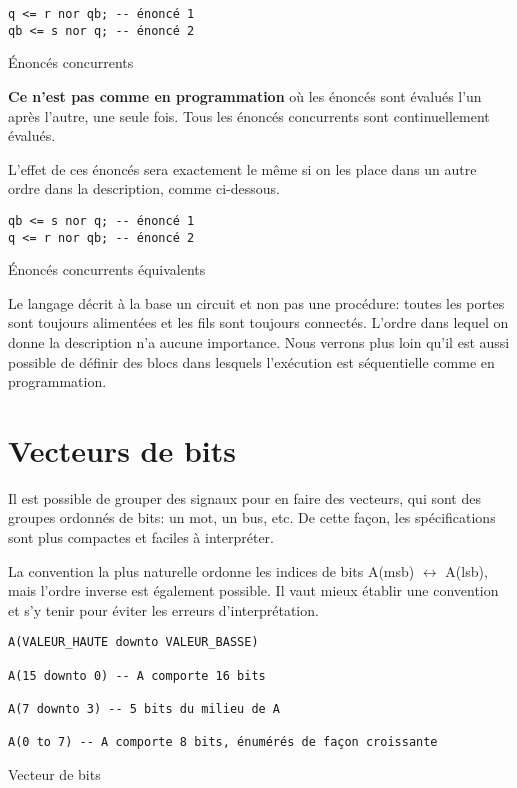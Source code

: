 \documentclass[letter, oneside]{book}
\begin{document}
\begin{listing}[htbp]
\begin{verbatim}
q <= r nor qb; -- énoncé 1
qb <= s nor q; -- énoncé 2
\end{verbatim}
\caption{Énoncés concurrents}
\end{listing}

\textbf{Ce n'est pas comme en programmation} où les énoncés sont évalués
l'un après l'autre, une seule fois. Tous les énoncés concurrents sont
continuellement évalués.

L'effet de ces énoncés sera exactement le même si on les place dans un
autre ordre dans la description, comme ci-dessous.

\begin{listing}[htbp]
\begin{verbatim}
qb <= s nor q; -- énoncé 1
q <= r nor qb; -- énoncé 2
\end{verbatim}
\caption{Énoncés concurrents équivalents}
\end{listing}

Le langage décrit à la base un circuit et non pas une procédure:
toutes les portes sont toujours alimentées et les fils sont toujours
connectés. L'ordre dans lequel on donne la description n'a aucune
importance. Nous verrons plus loin qu'il est aussi possible de définir
des blocs dans lesquels l'exécution est séquentielle comme en
programmation.

\section{Vecteurs de bits}
\label{sec:org5384bab}

Il est possible de grouper des signaux pour en faire des vecteurs, qui
sont des groupes ordonnés de bits: un mot, un bus, etc. De cette
façon, les spécifications sont plus compactes et faciles à
interpréter.

La convention la plus naturelle ordonne les indices de bits 
A(msb) \(\longleftrightarrow\) A(lsb),
mais l'ordre inverse est également possible. Il vaut mieux établir une
convention et s'y tenir pour éviter les erreurs d'interprétation.

\begin{listing}[htbp]
\begin{verbatim}
A(VALEUR_HAUTE downto VALEUR_BASSE)

A(15 downto 0) -- A comporte 16 bits

A(7 downto 3) -- 5 bits du milieu de A

A(0 to 7) -- A comporte 8 bits, énumérés de façon croissante
\end{verbatim}
\caption{Vecteur de bits}
\end{listing}
\end{document}
